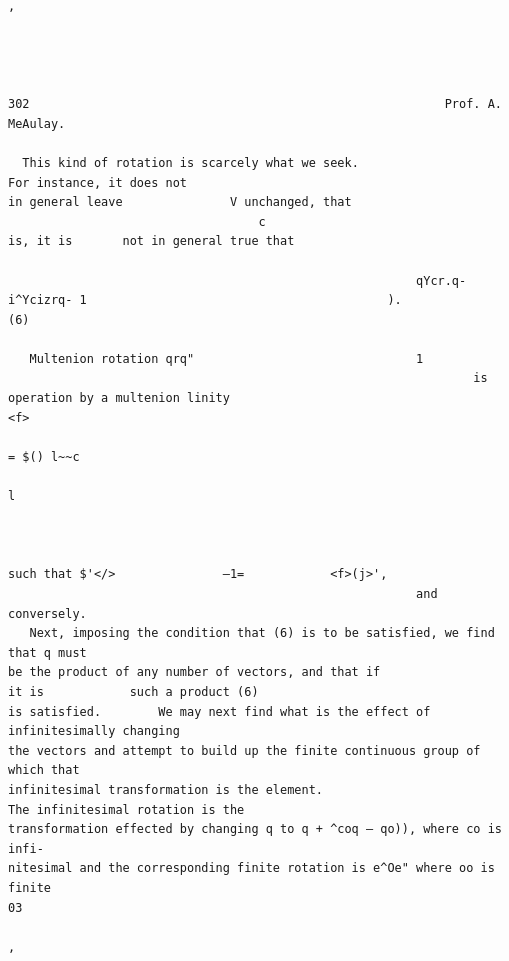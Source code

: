 \documentclass[10pt]{article}
\begin{document}
\begin{verbatim}

                                                                                                                                                          ,




302                                                          Prof. A.                       MeAulay.

  This kind of rotation is scarcely what we seek.                                                                          For instance, it does not
in general leave               V unchanged, that
                                   c                                                    is, it is       not in general true that

                                                         qYcr.q-i^Ycizrq- 1                                          ).                                                      (6)

   Multenion rotation qrq"                               1
                                                                 is     operation by a multenion linity                                                       <f>
                                                                                                                                                                    = $() l~~c
                                                                                                                                                                                 l



such that $'</>               —1=            <f>(j>',
                                                         and conversely.
   Next, imposing the condition that (6) is to be satisfied, we find that q must
be the product of any number of vectors, and that if                                                                           it is            such a product (6)
is satisfied.        We may next find what is the effect of infinitesimally changing
the vectors and attempt to build up the finite continuous group of which that
infinitesimal transformation is the element.                                                                 The infinitesimal rotation is the
transformation effected by changing q to q + ^coq — qo)), where co is infi-
nitesimal and the corresponding finite rotation is e^Oe" where oo is finite                                                                03
                                                                                                                                                ,





\end{verbatim}
\end{document}
